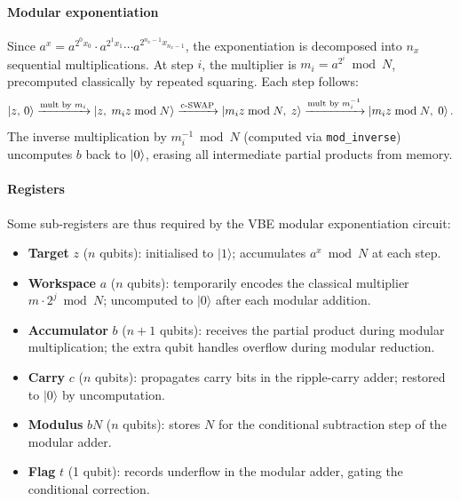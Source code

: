 \documentclass[11pt,a4paper]{article}
\newcommand{\code}[1]{\texttt{#1}}
\begin{document}
\paragraph{Modular exponentiation}
Since $a^x = a^{2^0 x_0} \cdot a^{2^1 x_1} \cdots a^{2^{n_x - 1} x_{n_x - 1}}$,
the exponentiation is decomposed into $n_x$ sequential multiplications. At step $i$,
the multiplier is $m_i = a^{2^i} \bmod N$, precomputed classically by repeated squaring.
Each step follows:
\begin{equation}
\ket{z,\,0}
\xrightarrow{\text{mult by } m_i}
\ket{z,\; m_i z \bmod N}
\xrightarrow{\text{c-SWAP}}
\ket{m_i z \bmod N,\; z}
\xrightarrow{\text{mult by } m_i^{-1}}
\ket{m_i z \bmod N,\; 0}.
\end{equation}
The inverse multiplication by $m_i^{-1} \bmod N$ (computed via \code{mod\_inverse})
uncomputes $b$ back to $\ket{0}$, erasing all intermediate partial products from memory.

\paragraph{Registers }
Some sub-registers are thus required by the VBE modular exponentiation circuit:

\begin{itemize}[leftmargin=2em, itemsep=4pt]
  \item \textbf{Target} $z$ ($n$ qubits): initialised to $|1\rangle$; accumulates 
        $a^x \bmod N$ at each step.
  \item \textbf{Workspace} $a$ ($n$ qubits): temporarily encodes the classical multiplier 
        $m \cdot 2^j \bmod N$; uncomputed to $|0\rangle$ after each modular addition.
  \item \textbf{Accumulator} $b$ ($n+1$ qubits): receives the partial product during 
        modular multiplication; the extra qubit handles overflow during modular reduction.
  \item \textbf{Carry} $c$ ($n$ qubits): propagates carry bits in the ripple-carry adder; 
        restored to $|0\rangle$ by uncomputation.
  \item \textbf{Modulus} $bN$ ($n$ qubits): stores $N$ for the conditional subtraction 
        step of the modular adder.
  \item \textbf{Flag} $t$ (1 qubit): records underflow in the modular adder, gating 
        the conditional correction.
\end{itemize}
\end{document}

